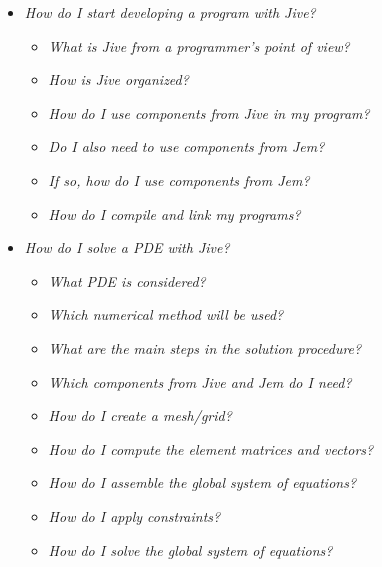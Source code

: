 \documentclass[a4paper,12pt]{article}
\begin{document}
\begin{itemize}

\item \emph{How do I start developing a program with Jive?}

  \begin{itemize}
  
  \item \emph{What is Jive from a programmer's point of view?}
    
  \item \emph{How is Jive organized?}
    
  \item \emph{How do I use components from Jive in my program?}
    
  \item \emph{Do I also need to use components from Jem?}
    
  \item \emph{If so, how do I use components from Jem?}
    
  \item \emph{How do I compile and link my programs?}

  \end{itemize}


\item \emph{How do I solve a PDE with Jive?}

  \begin{itemize}

  \item \emph{What PDE is considered?}

  \item \emph{Which numerical method will be used?}

  \item \emph{What are the main steps in the solution procedure?}

  \item \emph{Which components from Jive and Jem do I need?}

  \item \emph{How do I create a mesh/grid?}

  \item \emph{How do I compute the element matrices and vectors?}

  \item \emph{How do I assemble the global system of equations?}

  \item \emph{How do I apply constraints?}

  \item \emph{How do I solve the global system of equations?}

  \end{itemize}

\end{itemize}
\end{document}
